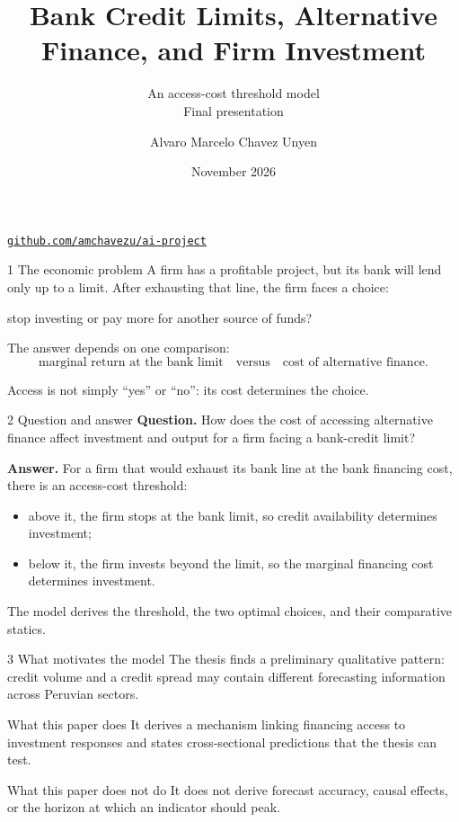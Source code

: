 \documentclass[aspectratio=169,11pt]{beamer}
\title{Bank Credit Limits, Alternative Finance, and Firm Investment}
\subtitle{An access-cost threshold model\\Final presentation}
\author{Alvaro Marcelo Chavez Unyen}
\institute{Universidad del Pacifico}
\date{November 2026}
\begin{document}
\begin{frame}[plain]
  \titlepage
  \begin{center}\small
    \href{https://github.com/amchavezu/ai-project}{\texttt{github.com/amchavezu/ai-project}}
  \end{center}
\end{frame}

\begin{frame}{1 \textperiodcentered{} The economic problem}
A firm has a profitable project, but its bank will lend only up to a limit.
After exhausting that line, the firm faces a choice:

\medskip
\begin{center}
\Large
stop investing
\quad or \quad
pay more for another source of funds?
\end{center}

\medskip
The answer depends on one comparison:
\[
\text{marginal return at the bank limit}
\quad\text{versus}\quad
\text{cost of alternative finance}.
\]

\vfill
\centering
\alert{Access is not simply ``yes'' or ``no'': its cost determines the choice.}
\end{frame}

\begin{frame}{2 \textperiodcentered{} Question and answer}
\textbf{Question.} How does the cost of accessing alternative finance affect
investment and output for a firm facing a bank-credit limit?

\medskip
\textbf{Answer.} For a firm that would exhaust its bank line at the bank
financing cost, there is an access-cost threshold:
\begin{itemize}
  \item above it, the firm stops at the bank limit, so credit availability
        determines investment;
  \item below it, the firm invests beyond the limit, so the marginal financing
        cost determines investment.
\end{itemize}

\medskip
The model derives the threshold, the two optimal choices, and their comparative
statics.
\end{frame}

\begin{frame}{3 \textperiodcentered{} What motivates the model}
The thesis finds a preliminary qualitative pattern: credit volume and a credit
spread may contain different forecasting information across Peruvian sectors.

\medskip
\begin{block}{What this paper does}
It derives a mechanism linking financing access to investment responses and
states cross-sectional predictions that the thesis can test.
\end{block}

\begin{alertblock}{What this paper does not do}
It does not derive forecast accuracy, causal effects, or the horizon at which
an indicator should peak.
\end{alertblock}
\end{frame}
\end{document}
